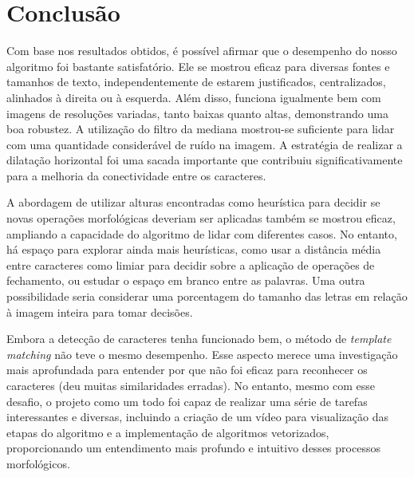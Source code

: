 \documentclass[english, 
               brazil, 
               bsc] %
               {dcomp-abntex2}
\begin{document}
\chapter{Conclusão} \label{ch-conclusao}


Com base nos resultados obtidos, é possível afirmar que o desempenho do nosso algoritmo foi bastante satisfatório. Ele se mostrou eficaz para diversas fontes e tamanhos de texto, independentemente de estarem justificados, centralizados, alinhados à direita ou à esquerda. Além disso, funciona igualmente bem com imagens de resoluções variadas, tanto baixas quanto altas, demonstrando uma boa robustez. A utilização do filtro da mediana mostrou-se suficiente para lidar com uma quantidade considerável de ruído na imagem. A estratégia de realizar a dilatação horizontal foi uma sacada importante que contribuiu significativamente para a melhoria da conectividade entre os caracteres.


A abordagem de utilizar alturas encontradas como heurística para decidir se novas operações morfológicas deveriam ser aplicadas também se mostrou eficaz, ampliando a capacidade do algoritmo de lidar com diferentes casos. No entanto, há espaço para explorar ainda mais heurísticas, como usar a distância média entre caracteres como limiar para decidir sobre a aplicação de operações de fechamento, ou estudar o espaço em branco entre as palavras. Uma outra possibilidade seria considerar uma porcentagem do tamanho das letras em relação à imagem inteira para tomar decisões.


Embora a detecção de caracteres tenha funcionado bem, o método de \textit{template matching} não teve o mesmo desempenho. Esse aspecto merece uma investigação mais aprofundada para entender por que não foi eficaz para reconhecer os caracteres (deu muitas similaridades erradas). No entanto, mesmo com esse desafio, o projeto como um todo foi capaz de realizar uma série de tarefas interessantes e diversas, incluindo a criação de um vídeo para visualização das etapas do algoritmo e a implementação de algoritmos vetorizados, proporcionando um entendimento mais profundo e intuitivo desses processos morfológicos.











\postextual




\renewcommand{\chapnumfont}{\chaptitlefont}
\renewcommand{\afterchapternum}{}
% 
% 
\end{document}

